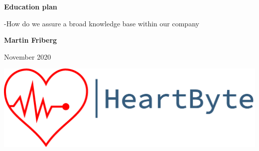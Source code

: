 \begin{titlepage}
   \begin{center}
       \vspace*{1cm}
        \Huge
       \textbf{Education plan}
        
        \Large
       \vspace{0.5cm}
        -How do we assure a broad knowledge base within our company
            
       \vspace{1.5cm}

       \textbf{Martin Friberg}



     \vspace{1cm}
     
    \small November 2020
     


      \vfill
\includegraphics[width=\linewidth]{Pictures/logo_heartbyte_transparent_v_1_1 (1)}

    \vfill
    \newpage
    \end{center}
\end{titlepage}